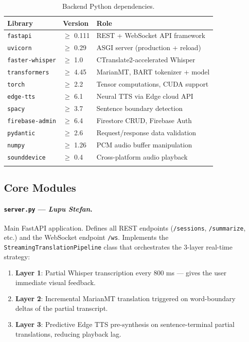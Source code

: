 \documentclass[12pt,a4paper]{report}
\begin{document}
\begin{longtable}{p{4.2cm} p{3.2cm} p{6cm}}
  \toprule
  \textbf{Library} & \textbf{Version} & \textbf{Role} \\
  \midrule
  \texttt{fastapi}         & $\ge$ 0.111   & REST + WebSocket API framework \\
  \texttt{uvicorn}         & $\ge$ 0.29    & ASGI server (production + reload) \\
  \texttt{faster-whisper}  & $\ge$ 1.0     & CTranslate2-accelerated Whisper \\
  \texttt{transformers}    & $\ge$ 4.45    & MarianMT, BART tokenizer + model \\
  \texttt{torch}           & $\ge$ 2.2     & Tensor computations, CUDA support \\
  \texttt{edge-tts}        & $\ge$ 6.1     & Neural TTS via Edge cloud API \\
  \texttt{spacy}           & $\ge$ 3.7     & Sentence boundary detection \\
  \texttt{firebase-admin}  & $\ge$ 6.4     & Firestore CRUD, Firebase Auth \\
  \texttt{pydantic}        & $\ge$ 2.6     & Request/response data validation \\
  \texttt{numpy}           & $\ge$ 1.26    & PCM audio buffer manipulation \\
  \texttt{sounddevice}     & $\ge$ 0.4     & Cross-platform audio playback \\
  \bottomrule
  \caption{Backend Python dependencies.}
\end{longtable}

\subsection{Core Modules}

\paragraph{\texttt{server.py} — \textit{Lupu Stefan}.}
Main FastAPI application. Defines all REST endpoints
(\texttt{/sessions}, \texttt{/summarize}, etc.) and the WebSocket
endpoint \texttt{/ws}. Implements the
\texttt{StreamingTranslationPipeline} class that orchestrates the
3-layer real-time strategy:

\begin{enumerate}
  \item \textbf{Layer 1}: Partial Whisper transcription every 800 ms
        — gives the user immediate visual feedback.
  \item \textbf{Layer 2}: Incremental MarianMT translation triggered on
        word-boundary deltas of the partial transcript.
  \item \textbf{Layer 3}: Predictive Edge TTS pre-synthesis on
        sentence-terminal partial translations, reducing playback lag.
\end{enumerate}
\end{document}

